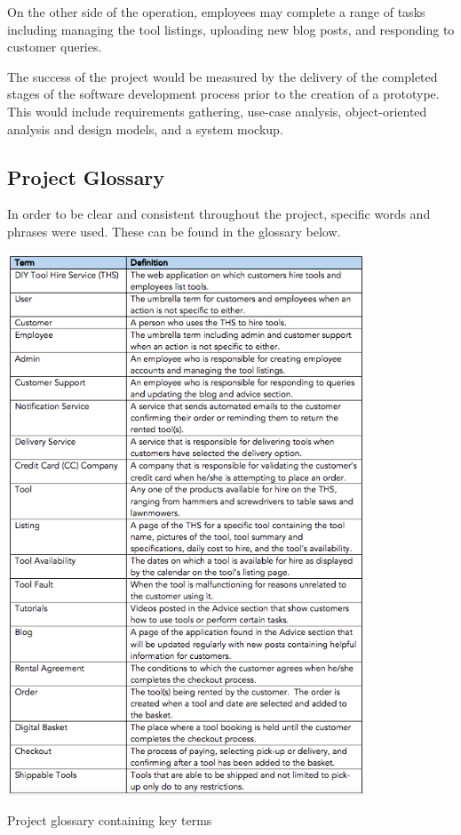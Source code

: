 On the other side of the operation, employees may complete a range of
tasks including managing the tool listings, uploading new blog posts,
and responding to customer queries.

The success of the project would be measured by the delivery of the
completed stages of the software development process prior to the
creation of a prototype. This would include requirements gathering,
use-case analysis, object-oriented analysis and design models, and a
system mockup.

\hypertarget{project-glossary}{%
\subsection{Project Glossary}\label{project-glossary}}

In order to be clear and consistent throughout the project, specific
words and phrases were used. These can be found in the glossary below.

\begin{table}[H]
      \centering
      \includegraphics[trim = 0 0 0 0, clip, width=0.8\textwidth]{TempImg/glossary.png}
      \caption{Project glossary containing key terms}
\label{conreq}
 \end{table}


